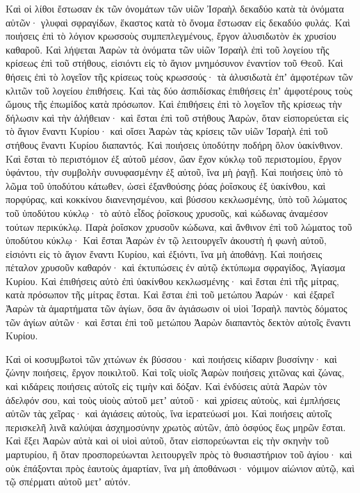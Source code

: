 {Καὶ οἱ λίθοι ἔστωσαν ἐκ τῶν ὀνομάτων τῶν υἱῶν Ἰσραὴλ δεκαδύο κατὰ τὰ ὀνόματα αὐτῶν· γλυφαὶ σφραγίδων, ἕκαστος κατὰ τὸ ὄνομα ἔστωσαν εἰς δεκαδύο φυλάς.
Καὶ ποιήσεις ἐπὶ τὸ λόγιον κρωσσοὺς συμπεπλεγμένους, ἔργον ἁλυσιδωτὸν ἐκ χρυσίου καθαροῦ.
Καὶ λήψεται Ἀαρὼν τὰ ὀνόματα τῶν υἱῶν Ἰσραὴλ ἐπὶ τοῦ λογείου τῆς κρίσεως ἐπὶ τοῦ στήθους, εἰσιόντι εἰς τὸ ἅγιον μνημόσυνον ἐναντίον τοῦ Θεοῦ.
Καὶ θήσεις ἐπὶ τὸ λογεῖον τῆς κρίσεως τοὺς κρωσσούς· τὰ ἁλυσιδωτὰ ἐπʼ ἀμφοτέρων τῶν κλιτῶν τοῦ λογείου ἐπιθήσεις. Καὶ τὰς δύο ἀσπιδίσκας ἐπιθήσεις ἐπʼ ἀμφοτέρους τοὺς ὤμους τῆς ἐπωμίδος κατὰ πρόσωπον.
Καὶ ἐπιθήσεις ἐπὶ τὸ λογεῖον τῆς κρίσεως τὴν δήλωσιν καὶ τὴν ἀλήθειαν· καὶ ἔσται ἐπὶ τοῦ στήθους Ἀαρὼν, ὅταν εἰσπορεύεται εἰς τὸ ἅγιον ἔναντι Κυρίου· καὶ οἴσει Ἀαρὼν τὰς κρίσεις τῶν υἱῶν Ἰσραὴλ ἐπὶ τοῦ στήθους ἔναντι Κυρίου διαπαντός.
Καὶ ποιήσεις ὑποδύτην ποδήρη ὅλον ὑακίνθινον.
Καὶ ἔσται τὸ περιστόμιον ἐξ αὐτοῦ μέσον, ὤαν ἔχον κύκλῳ τοῦ περιστομίου, ἔργον ὑφάντου, τὴν συμβολὴν συνυφασμένην ἐξ αὐτοῦ, ἵνα μὴ ῥαγῇ.
Καὶ ποιήσεις ὑπὸ τὸ λῶμα τοῦ ὑποδύτου κάτωθεν, ὡσεὶ ἐξανθούσης ῥόας ῥοΐσκους ἐξ ὑακίνθου, καὶ πορφύρας, καὶ κοκκίνου διανενησμένου, καὶ βύσσου κεκλωσμένης, ὑπὸ τοῦ λώματος τοῦ ὑποδύτου κύκλῳ· τὸ αὐτὸ εἶδος ῥοΐσκους χρυσοῦς, καὶ κώδωνας ἀναμέσον τούτων περικύκλῳ.
Παρὰ ῥοΐσκον χρυσοῦν κώδωνα, καὶ ἄνθινον ἐπὶ τοῦ λώματος τοῦ ὑποδύτου κύκλῳ·
Καὶ ἔσται Ἀαρὼν ἐν τῷ λειτουργεῖν ἀκουστὴ ἡ φωνὴ αὐτοῦ, εἰσιόντι εἰς τὸ ἅγιον ἔναντι Κυρίου, καὶ ἐξιόντι, ἵνα μὴ ἀποθάνῃ.
Καὶ ποιήσεις πέταλον χρυσοῦν καθαρόν· καὶ ἐκτυπώσεις ἐν αὐτῷ ἐκτύπωμα σφραγίδος, Ἁγίασμα Κυρίου.
Καὶ ἐπιθήσεις αὐτὸ ἐπὶ ὑακίνθου κεκλωσμένης· καὶ ἔσται ἐπὶ τῆς μίτρας, κατὰ πρόσωπον τῆς μίτρας ἔσται.
Καὶ ἔσται ἐπὶ τοῦ μετώπου Ἀαρών· καὶ ἐξαρεῖ Ἀαρὼν τὰ ἁμαρτήματα τῶν ἁγίων, ὅσα ἂν ἁγιάσωσιν οἱ υἱοὶ Ἰσραὴλ παντὸς δόματος τῶν ἁγίων αὐτῶν· καὶ ἔσται ἐπὶ τοῦ μετώπου Ἀαρὼν διαπαντὸς δεκτὸν αὐτοῖς ἔναντι Κυρίου.
\par }{\PP {}Καὶ οἱ κοσυμβωτοὶ τῶν χιτώνων ἐκ βύσσου· καὶ ποιήσεις κίδαριν βυσσίνην· καὶ ζώνην ποιήσεις, ἔργον ποικιλτοῦ.
Καὶ τοῖς υἱοῖς Ἀαρὼν ποιήσεις χιτῶνας καὶ ζώνας, καὶ κιδάρεις ποιήσεις αὐτοῖς εἰς τιμὴν καὶ δόξαν.
Καὶ ἐνδύσεις αὐτὰ Ἀαρὼν τὸν ἀδελφόν σου, καὶ τοὺς υἱοὺς αὐτοῦ μετʼ αὐτοῦ· καὶ χρίσεις αὐτοὺς, καὶ ἐμπλήσεις αὐτῶν τὰς χεῖρας· καὶ ἁγιάσεις αὐτοὺς, ἵνα ἱερατεύωσί μοι.
Καὶ ποιήσεις αὐτοῖς περισκελῆ λινᾶ καλύψαι ἀσχημοσύνην χρωτὸς αὐτῶν, ἀπὸ ὀσφύος ἕως μηρῶν ἔσται.
Καὶ ἕξει Ἀαρὼν αὐτὰ καὶ οἱ υἱοὶ αὐτοῦ, ὅταν εἰσπορεύωνται εἰς τὴν σκηνὴν τοῦ μαρτυρίου, ἢ ὅταν προσπορεύωνται λειτουργεῖν πρὸς τὸ θυσιαστήριον τοῦ ἁγίου· καὶ οὐκ ἐπάξονται πρὸς ἑαυτοὺς ἁμαρτίαν, ἵνα μὴ ἀποθάνωσι· νόμιμον αἰώνιον αὐτῷ, καὶ τῷ σπέρματι αὐτοῦ μετʼ αὐτόν.

}

